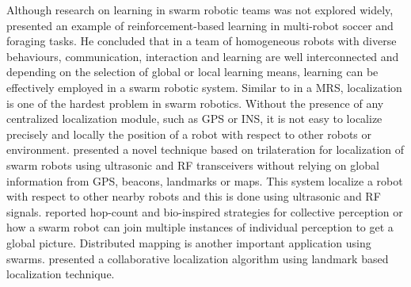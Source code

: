 Although research on learning in swarm robotic teams was not explored widely, \cite{Balch2005} presented an example of reinforcement-based learning in multi-robot soccer and foraging tasks. He concluded that in a team of homogeneous robots with diverse behaviours, communication, interaction and learning are well interconnected and depending on the selection of global or local learning means, learning can be effectively employed in a swarm robotic system.
Similar to in a MRS, localization is one of the hardest problem in swarm robotics. Without the presence of any centralized localization module, such as GPS or INS, it is not easy to localize precisely and locally the position of a robot with respect to other robots or environment. \cite{Spears+2006} presented a novel technique based on trilateration for localization of swarm robots using ultrasonic and RF transceivers without relying on global information from GPS, beacons, landmarks or maps. This system localize a robot with respect to other nearby robots and this is done using ultrasonic and RF signals. \cite{Schmickl+2006} reported hop-count and bio-inspired strategies for collective perception or how a swarm robot can join multiple instances of individual perception to get a global picture. Distributed mapping is another important application using swarms. \cite{Rothermich+05} presented a collaborative localization algorithm using landmark based localization technique.

